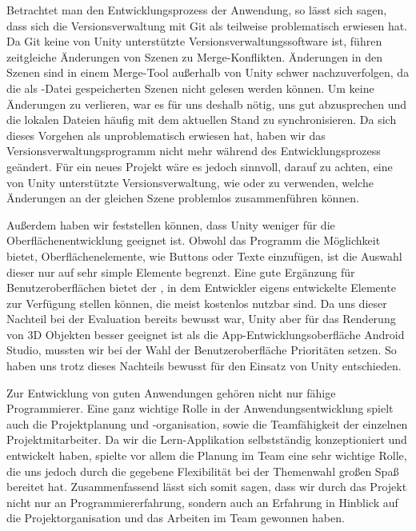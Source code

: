 Betrachtet man den Entwicklungsprozess der Anwendung, so lässt sich sagen, dass sich die Versionsverwaltung mit Git als teilweise problematisch erwiesen hat.
Da Git keine von Unity unterstützte Versionsverwaltungssoftware ist, führen zeitgleiche Änderungen von Szenen zu Merge-Konflikten.
Änderungen in den Szenen sind in einem Merge-Tool außerhalb von Unity schwer nachzuverfolgen, da die als -Datei gespeicherten Szenen nicht gelesen werden können. 
Um keine Änderungen zu verlieren, war es für uns deshalb nötig, uns gut abzusprechen und die lokalen Dateien häufig mit dem aktuellen Stand zu synchronisieren.
Da sich dieses Vorgehen als unproblematisch erwiesen hat, haben wir das Versionsverwaltungsprogramm nicht mehr während des Entwicklungsprozess geändert.
Für ein neues Projekt wäre es jedoch sinnvoll, darauf zu achten, eine von Unity unterstützte Versionsverwaltung, wie  oder  zu verwenden, welche Änderungen an der gleichen Szene problemlos zusammenführen können.

Außerdem haben wir feststellen können, dass Unity weniger für die Oberflächenentwicklung geeignet ist. 
Obwohl das Programm die Möglichkeit bietet, Oberflächenelemente, wie Buttons oder Texte einzufügen, ist die Auswahl dieser nur auf sehr simple Elemente begrenzt.
Eine gute Ergänzung für Benutzeroberflächen bietet der , in dem Entwickler eigens entwickelte Elemente zur Verfügung stellen können, die meist kostenlos nutzbar sind.
Da uns dieser Nachteil bei der Evaluation bereits bewusst war, Unity aber für das Renderung von 3D Objekten besser geeignet ist als die App-Entwicklungsoberfläche Android Studio, mussten wir bei der Wahl der Benutzeroberfläche Prioritäten setzen. So haben uns trotz dieses Nachteils bewusst für den Einsatz von Unity entschieden.

Zur Entwicklung von guten Anwendungen gehören nicht nur fähige Programmierer.
Eine ganz wichtige Rolle in der Anwendungsentwicklung spielt auch die Projektplanung und -organisation, sowie die Teamfähigkeit der einzelnen Projektmitarbeiter.
Da wir die Lern-Applikation selbstständig konzeptioniert und entwickelt haben, spielte vor allem die Planung im Team eine sehr wichtige Rolle, die uns jedoch durch die gegebene Flexibilität bei der Themenwahl großen Spaß bereitet hat.
Zusammenfassend lässt sich somit sagen, dass wir durch das Projekt nicht nur an Programmiererfahrung, sondern auch an Erfahrung in Hinblick auf die Projektorganisation und das Arbeiten im Team gewonnen haben. 